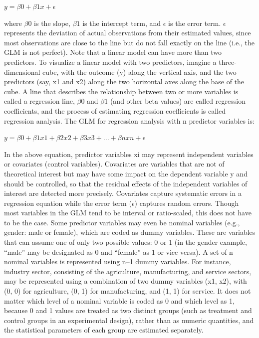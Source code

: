 $ y = \beta0 + \beta1 x + \epsilon $

where $ \beta0 $ is the slope, $ \beta1 $ is the intercept term, and $ \epsilon $ is the error term. $ \epsilon $ represents the deviation of actual observations from their estimated values, since most observations are close to the line but do not fall exactly on the line (i.e., the GLM is not perfect). Note that a linear model can have more than two predictors. To visualize a linear model with two predictors, imagine a three-dimensional cube, with the outcome (y) along the vertical axis, and the two predictors (say, x1 and x2) along the two horizontal axes along the base of the cube. A line that describes the relationship between two or more variables is called a regression line, $ \beta0 $ and $ \beta1 $ (and other beta values) are called regression coefficients, and the process of estimating regression coefficients is called regression analysis. The GLM for regression analysis with n predictor variables is:

$ y = \beta0 + \beta1 x1 + \beta2 x2 + \beta3 x3 + ... + \beta n xn + \epsilon $

In the above equation, predictor variables xi may represent independent variables or covariates (control variables). Covariates are variables that are not of theoretical interest but may have some impact on the dependent variable y and should be controlled, so that the residual effects of the independent variables of interest are detected more precisely. Covariates capture systematic errors in a regression equation while the error term ($ \epsilon $) captures random errors. Though most variables in the GLM tend to be interval or ratio-scaled, this does not have to be the case. Some predictor variables may even be nominal variables (e.g., gender: male or female), which are coded as dummy variables. These are variables that can assume one of only two possible values: 0 or 1 (in the gender example, ``male'' may be designated as 0 and ``female'' as 1 or vice versa). A set of n nominal variables is represented using n–1 dummy variables. For instance, industry sector, consisting of the agriculture, manufacturing, and service sectors, may be represented using a combination of two dummy variables (x1, x2), with (0, 0) for agriculture, (0, 1) for manufacturing, and (1, 1) for service. It does not matter which level of a nominal variable is coded as 0 and which level as 1, because 0 and 1 values are treated as two distinct groups (such as treatment and control groups in an experimental design), rather than as numeric quantities, and the statistical parameters of each group are estimated separately. 

